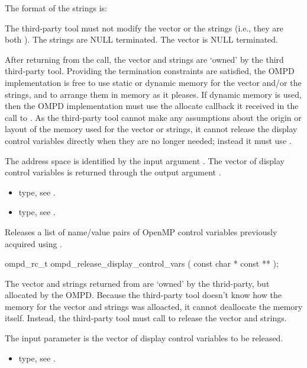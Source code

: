 The format of the strings is:
\begin{center}
\end{center}

The third-party tool must not modify the vector or the strings
(i.e., they are both ).
The strings are NULL terminated.
The vector is NULL terminated.

After returning from the call, the vector and strings are `owned'
by the third third-party tool.
Providing the termination constraints are satisfied, the OMPD
implementation is free to use static or dynamic memory for the
vector and/or the strings, and to arrange them in memory
as it pleases.
If dynamic memory is used, then the OMPD implementation must use
the allocate callback it received in the call to .
As the third-party tool cannot make any assumptions about the origin or
layout of the memory used for the vector or strings, it cannot release
the display control variables directly when they are no longer
needed; instead it must use .

\argdesc
The address space is identified by the input argument .
The vector of display control variables is returned through
the output argument .

\crossreferences
\begin{itemize}
	\item {} type, see .
	\item {} type, see .
\end{itemize}


\label{ompd:ompd_release_display_control_vars}
\label{sec:ompd_release_display_control_vars}
\summary

Releases a list of name/value pairs of OpenMP control variables
previously acquired using .
\format
\cspecificstart
\begin{ompSyntax}
ompd_rc_t ompd_release_display_control_vars (
  const char * const **
);
\end{ompSyntax}
\cspecificend

\descr
The vector and strings returned from 
are `owned' by the thrid-party, but allocated by the OMPD.
Because the third-party tool doesn't know how the memory for the vector
and strings was alloacted, it cannot deallocate the memory itself.
Instead, the third-party tool must call
 to release the vector
and strings.

\argdesc
The input parameter  is the vector of display control variables to be released.

\crossreferences
\begin{itemize}
	\item {} type, see .
\end{itemize}
